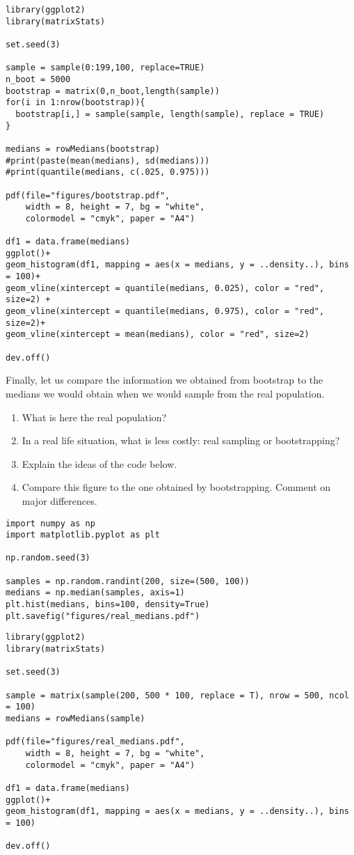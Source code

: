 \begin{verbatim}
library(ggplot2)
library(matrixStats)

set.seed(3)

sample = sample(0:199,100, replace=TRUE)
n_boot = 5000
bootstrap = matrix(0,n_boot,length(sample))
for(i in 1:nrow(bootstrap)){
  bootstrap[i,] = sample(sample, length(sample), replace = TRUE)
}

medians = rowMedians(bootstrap)
#print(paste(mean(medians), sd(medians)))
#print(quantile(medians, c(.025, 0.975)))

pdf(file="figures/bootstrap.pdf",
    width = 8, height = 7, bg = "white",
    colormodel = "cmyk", paper = "A4")

df1 = data.frame(medians)
ggplot()+
geom_histogram(df1, mapping = aes(x = medians, y = ..density..), bins = 100)+
geom_vline(xintercept = quantile(medians, 0.025), color = "red", size=2) +
geom_vline(xintercept = quantile(medians, 0.975), color = "red", size=2)+
geom_vline(xintercept = mean(medians), color = "red", size=2)

dev.off()
\end{verbatim}

\begin{exercise}
Finally, let us compare the information we obtained from bootstrap to the medians we would obtain when we would sample from the real population.
\begin{enumerate}
\item What is here the real population?
\item In a real life situation, what is less costly: real sampling or bootstrapping?
\item Explain the ideas of the code below.
\item Compare this figure to the one obtained by bootstrapping. Comment on major differences.
\end{enumerate}
\begin{verbatim}
import numpy as np
import matplotlib.pyplot as plt

np.random.seed(3)

samples = np.random.randint(200, size=(500, 100))
medians = np.median(samples, axis=1)
plt.hist(medians, bins=100, density=True)
plt.savefig("figures/real_medians.pdf")
\end{verbatim}

\begin{verbatim}
library(ggplot2)
library(matrixStats)

set.seed(3)

sample = matrix(sample(200, 500 * 100, replace = T), nrow = 500, ncol = 100)
medians = rowMedians(sample)

pdf(file="figures/real_medians.pdf",
    width = 8, height = 7, bg = "white",
    colormodel = "cmyk", paper = "A4")

df1 = data.frame(medians)
ggplot()+
geom_histogram(df1, mapping = aes(x = medians, y = ..density..), bins = 100)

dev.off()
\end{verbatim}
\end{exercise}





